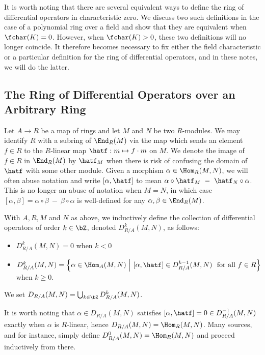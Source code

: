 It is worth noting that there are several equivalent ways to define the ring of differential operators in characteristic zero. We discuss two such definitions in the case of a polynomial ring over a field and show that they are equivalent when $\fchar(K) = 0$. However, when $\fchar(K) > 0$, these two definitions will no longer coincide. It therefore becomes necessary to fix either the field characteristic or a particular definition for the ring of differential operators, and in these notes, we will do the latter.

\subsection{The Ring of Differential Operators over an Arbitrary Ring}\label{sec:general-diff-ops}
Let $A\to R$ be a map of rings and let $M$ and $N$ be two $R$-modules. We may identify $R$ with a subring of $\End_R(M)$ via the map which sends an element $f \in R$ to the $R$-linear map $\hatf:m\mapsto f\cdot m$ on $M$. We denote the image of $f \in R$ in $\End_R(M)$ by $\hatf_M$ when there is risk of confusing the domain of $\hatf$ with some other module. Given a morphism $\alpha \in \Hom_R(M,N)$, we will often abuse notation and write $[\alpha, \hatf]$ to mean $\alpha \circ \hatf_M ~-~ \hatf_N\circ \alpha$. This is no longer an abuse of notation when $M = N$, in which case $[\alpha,\beta] = \alpha \circ \beta ~-~ \beta\circ\alpha$ is well-defined for any $\alpha, \beta \in \End_R(M)$.

\begin{defn}\label{defn:diff-ops}
	With $A,R,M$ and $N$ as above, we inductively define the collection of differential operators of order $k \in \bZ$, denoted $D^k_{R/A}(M,N)$, as follows:
	\begin{itemize}
		\item $D^k_{R/A}(M,N) = 0$ when $k < 0$
		\item $D^k_{R/A}(M,N) = \left\{\alpha \in \Hom_A(M,N) ~\middle|~ \left[\alpha,\hatf\right] \in D^{k-1}_{R/A}(M,N) ~ \text{ for all } f\in R\right\} $ when $k \geq 0$.
	\end{itemize}
	We set $D_{R/A}(M,N) = \bigcup_{k\in \bZ} D^k_{R/A}(M,N)$.
\end{defn}
\begin{rmk}\label{rmk:starting-index-of-diff-op-def}
	It is worth noting that $\alpha \in D_{R/A}(M,N)$ satisfies $[\alpha,\hatf] = 0 \in D^{-1}_{R/A}(M,N)$ exactly when $\alpha$ is $R$-linear, hence $D_{R/A}(M,N) = \Hom_R(M,N)$. Many sources, \cite{ginzburg_d-mod} and \cite{bernstein_d-mod} for instance, simply define $D^0_{R/A}(M,N) = \Hom_{R}(M,N)$ and proceed inductively from there.
\end{rmk}

